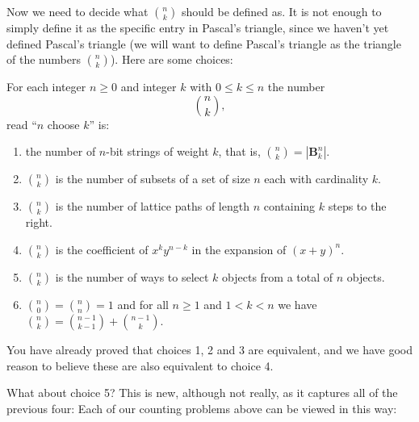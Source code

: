 \documentclass[10pt,]{book}
\theoremstyle{plain}
\theoremstyle{definition}
\theoremstyle{definition}
\theoremstyle{definition}
\numberwithin{equation}{chapter}
\def\B{\mathbf{B}}
\newcommand{\lt}{<}
\begin{document}
\par
\hypertarget{p-70}{}%
Now we need to decide what \(\binom{n}{k}\) should be defined as.  It is not enough to simply define it as the specific entry in Pascal's triangle, since we haven't yet defined Pascal's triangle (we will want to define Pascal's triangle as the triangle of the numbers \(\binom{n}{k}\)).  Here are some choices:%
\begin{assemblage}\label{assemblage-1}
\hypertarget{p-71}{}%
 For each integer \(n \ge 0\) and integer \(k\) with \(0 \le k \le n\) the number%
\begin{equation*}
{n\choose k},
\end{equation*}
read ``\(n\) choose \(k\)'' is: \leavevmode%
\begin{enumerate}
\item\hypertarget{li-6}{}the number of \(n\)-bit strings of weight \(k\), that is, \({n\choose k} = |\B^n_k|\).%
\item\hypertarget{li-7}{}\({n \choose k}\) is the number of subsets of a set of size \(n\) each with cardinality \(k\).%
\item\hypertarget{li-8}{}\({n \choose k}\) is the number of lattice paths of length \(n\) containing \(k\) steps to the right.%
\item\hypertarget{li-9}{}\({n \choose k}\) is the coefficient of \(x^ky^{n-k}\) in the expansion of \((x+y)^n\).%
\item\hypertarget{li-10}{}\({n \choose k}\) is the number of ways to select \(k\) objects from a total of \(n\) objects.%
\item\hypertarget{li-11}{}\hypertarget{p-72}{}%
\(\binom{n}{0} = \binom{n}{n} = 1\) and for all \(n \ge 1\) and \(1 \lt k \lt n\) we have \(\binom{n}{k} = \binom{n-1}{k-1} + \binom{n-1}{k}\).%
\end{enumerate}
%
\end{assemblage}
\hypertarget{p-73}{}%
You have already proved that choices 1, 2 and 3 are equivalent, and we have good reason to believe these are also equivalent to choice 4.%
\par
\hypertarget{p-74}{}%
What about choice 5?  This is new, although not really, as it captures all of the previous four: Each of our counting problems above can be viewed in this way: \leavevmode%
\end{document}
